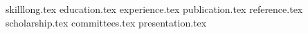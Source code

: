 \documentclass[11pt, a4paper]{awesome-cv}
\newcommand*{\sectiondir}{resume/}
\begin{document}
\makecvheader    
   
{skilllong.tex}
{education.tex}
{experience.tex}
{publication.tex}
{reference.tex}
{scholarship.tex}
{committees.tex}
{presentation.tex}  
\end{document}
